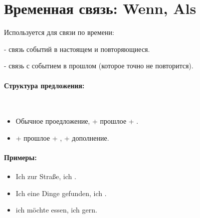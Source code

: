 \section{Временная связь: Wenn, Als}

Используется для связи по времени:

 - связь событий в настоящем и повторяющиеся. 

 - связь с событием в прошлом (которое точно не повторится). 

\paragraph{Структура предложения:} ~\\
\begin{itemize}
\item Обычное проедложение,  + прошлое + \dverb{}.
\item {} + прошлое + \dverb{}, \dverb{} + дополнение.
\end{itemize}

\paragraph{Примеры:}
\begin{itemize}
\item Ich  zur Straße,  ich .
~\\ 
\item Ich  eine Dinge gefunden,  ich .
~\\ 
\item {} ich möchte essen,  ich gern.
~\\ 
\end{itemize}

